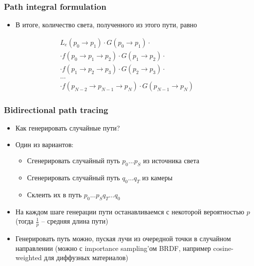 \documentclass[10pt]{beamer}
\begin{document}
\begin{frame}
\frametitle{Path integral formulation}
\begin{itemize}
\item В итоге, количество света, полученного из этого пути, равно
\end{itemize}
\begin{gather*}
L_e(p_0\rightarrow p_1)\cdot G(p_0\rightarrow p_1) \cdot \\
\cdot f(p_0\rightarrow p_1\rightarrow p_2) \cdot G(p_1\rightarrow p_2) \cdot \\
\cdot f(p_1\rightarrow p_2\rightarrow p_3) \cdot G(p_2\rightarrow p_3) \cdot \\
\dots \\
\cdot f(p_{N-2}\rightarrow p_{N-1}\rightarrow p_N) \cdot G(p_{N-1}\rightarrow p_N)
\end{gather*}
\end{frame}

\begin{frame}
\frametitle{Bidirectional path tracing}
\begin{itemize}
\item Как генерировать случайные пути?
\pause
\item Один из вариантов:
\pause
\begin{itemize}
\item Сгенерировать случайный путь \begin{math}p_0\dots p_S\end{math} из источника света
\pause
\item Сгенерировать случайный путь \begin{math}q_0\dots q_T\end{math} из камеры
\pause
\item Склеить их в путь \begin{math}p_0\dots p_S q_T \dots q_0\end{math} 
\end{itemize}
\pause
\item На каждом шаге генерации пути останавливаемся с некоторой вероятностью \begin{math}p\end{math} (тогда \begin{math}\frac{1}{p}\end{math} -- средняя длина пути)
\pause
\item Генерировать путь можно, пуская лучи из очередной точки в случайном направлении (можно с importance sampling'ом BRDF, например cosine-weighted для диффузных материалов)
\end{itemize}
\end{frame}
\end{document}

